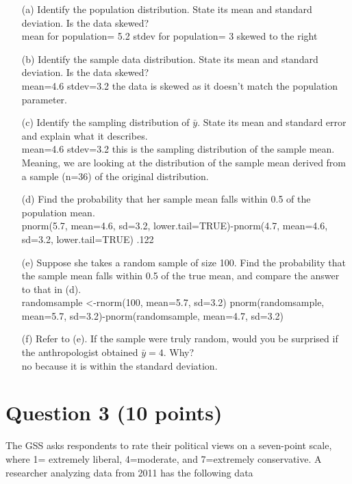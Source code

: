 \documentclass[12pt,letterpaper]{article}
\begin{document}
\begin{itemize}

\item[(a)] Identify the population distribution. State its mean and standard deviation. Is the data skewed?\\
mean for population= 5.2
stdev for population= 3
skewed to the right 

\item[(b)] Identify the sample data distribution. State its mean and standard deviation. Is the data skewed?\\

mean=4.6
stdev=3.2
the data is skewed as it doesn't match the population parameter.
\item[(c)] Identify the sampling distribution of $\bar{y}$. State its mean and standard error and explain what it describes.\\
mean=4.6 stdev=3.2
this is the sampling distribution of the sample mean. Meaning, we are looking at the distribution of the sample mean derived from a sample (n=36) of the original distribution.

\item[(d)] Find the probability that her sample mean falls within 0.5 of the population mean.\\
pnorm(5.7, mean=4.6, sd=3.2, lower.tail=TRUE)-pnorm(4.7, mean=4.6, sd=3.2, lower.tail=TRUE)
.122
\item[(e)] Suppose she takes a random sample of size 100. Find the probability that the sample mean falls within 0.5 of the true mean, and compare the answer to that in (d).\\

randomsample <-rnorm(100, mean=5.7, sd=3.2)
pnorm(randomsample, mean=5.7, sd=3.2)-pnorm(randomsample, mean=4.7, sd=3.2)

\item[(f)] Refer to (e). If the sample were truly random, would you be surprised if the anthropologist obtained $\bar{y}=4$. Why?\\
no because it is within the standard deviation. 
\end{itemize}

\section*{Question 3 (10 points)}
The GSS asks respondents to rate their political views on a seven-point scale, where 1= extremely liberal, 4=moderate, and 7=extremely conservative. A researcher analyzing data from 2011 has the following data
\end{document}
